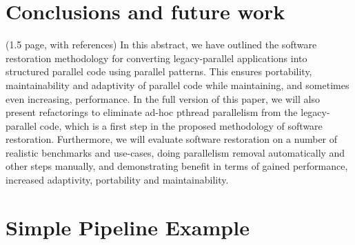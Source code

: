\section{Conclusions and future work} \label{sec:Conclusions} (1.5 page, with references)
In this abstract, we have outlined the software restoration methodology for converting legacy-parallel applications into structured parallel code using parallel patterns. This ensures portability, maintainability and adaptivity of parallel code while maintaining, and sometimes even increasing, performance. In the full version of this paper, we will also present refactorings to eliminate ad-hoc pthread parallelism from the legacy-parallel code, which is a first step in the proposed methodology of software restoration. Furthermore, we will evaluate software restoration on a number of realistic benchmarks and use-cases, doing parallelism removal automatically and other steps manually, and demonstrating benefit in terms of gained performance, increased adaptivity, portability and maintainability.

\appendix
\section{Simple Pipeline Example}


